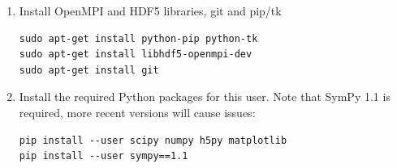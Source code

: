 \documentclass[11pt]{article}
\begin{document}
\begin{enumerate}
\item{Install OpenMPI and HDF5 libraries, git and pip/tk
\begin{verbatim}
sudo apt-get install python-pip python-tk
sudo apt-get install libhdf5-openmpi-dev
sudo apt-get install git
\end{verbatim}}
\item{Install the required Python packages for this user. Note that SymPy 1.1 is required, more recent versions will cause issues:}
\begin{verbatim}
pip install --user scipy numpy h5py matplotlib
pip install --user sympy==1.1
\end{verbatim}

\end{enumerate}
\end{document}
